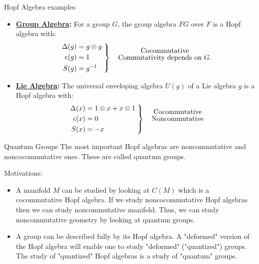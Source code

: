 \documentclass[pdf,colorBG,slideColor,fyma]{prosper}
\begin{document}
\begin{slide}{Hopf Algebra examples}
\begin{itemize}
  \item{
    \textbf{\underline{Group Algebra}:} For a group $G$, the group algebra $FG$ over $F$
    is a Hopf algebra with:
        \[
        \left.
        \begin{aligned}
        \Delta(g) & = g \otimes g \\
        \epsilon(g) & = 1 \\
        S(g) & = g^{-1}
        \end{aligned}\;
        \right\} \quad
        \shortstack{
            \text{Cocommutative} \\
            \text{Commutativity depends on $G$.}
        }
        \]
    }
  \item{
    \textbf{\underline{Lie Algebra}:} The universal enveloping algebra $U(g)$ of a Lie
      algebra $g$ is a Hopf algebra with:
        \[
        \left.
        \begin{aligned}
        \Delta(x) & = 1 \otimes x + x \otimes 1 \\
        \epsilon(x) & = 0 \\
        S(x) & = -x
        \end{aligned}\;
        \right\} \quad
        \shortstack{
            \text{Cocommutative} \\
            \text{Noncommutative}
        }
        \]

    }
\end{itemize}
\end{slide}

\begin{slide}{Quantum Groups}
The most important Hopf algebras are noncommutative and
noncocommutative ones. These are called quantum groups.

Motivations:
\begin{itemize}
  \item{A manifold $M$ can be studied by looking at $C(M)$ which is a cocommutative Hopf algebra.
   If we study noncocommutative Hopf algebras then we can study noncommutative manifold. Thus, we
   can study noncommutative geometry by looking at quantum groups.
  }
  \item{A group can be described fully by its Hopf algebra. A "deformed" version of the Hopf algebra
   will enable one to study "deformed" ("quantized") groups. The study of "quantized" Hopf algebras is
   a study of "quantum" groups.
  }
\end{itemize}
\end{slide}
\end{document}
